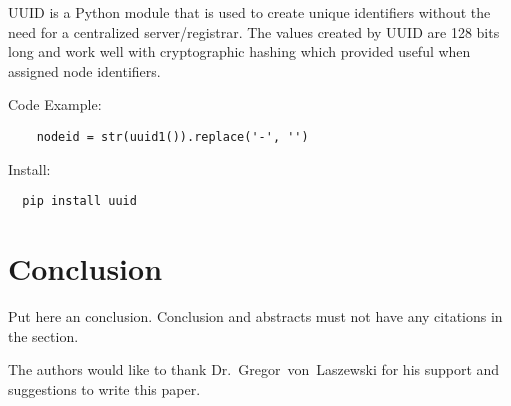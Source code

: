 UUID is a Python module that is used to create unique identifiers without the need for a 
centralized server/registrar. The values created by UUID are 128 bits long and work well with 
cryptographic hashing which provided useful when assigned node identifiers.

Code Example:
\begin{verbatim}
	nodeid = str(uuid1()).replace('-', '')
\end{verbatim} 

Install:
\begin{verbatim}
  pip install uuid
\end{verbatim}



\section{Conclusion}

Put here an conclusion. Conclusion and abstracts must not have any
citations in the section.


\begin{acks}

  The authors would like to thank Dr.~Gregor~von~Laszewski for his
  support and suggestions to write this paper.

\end{acks}


 

